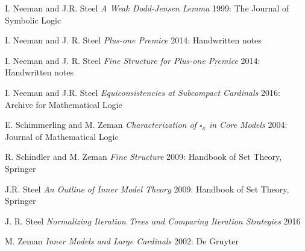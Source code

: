 \documentclass[12pt]{article}
\begin{document}
\begin{thebibliography}{1}


 I. Neeman and J.R. Steel {\em A Weak Dodd-Jensen Lemma} 1999: The Journal of Symbolic Logic

 I. Neeman and J. R. Steel {\em Plus-one Premice} 2014: Handwritten notes

 I. Neeman and J. R. Steel {\em Fine Structure for Plus-one Premice} 2014: Handwritten notes


 I. Neeman and J.R. Steel {\em Equiconsistencies at Subcompact Cardinals} 2016: Archive for Mathematical Logic


 E. Schimmerling and M. Zeman {\em Characterization of $\square_{\kappa}$ in Core Models} 2004: Journal of Mathematical Logic

 R. Schindler and M. Zeman {\em Fine Structure} 2009: Handbook of Set Theory, Springer



 J.R. Steel  {\em An Outline of Inner Model Theory} 2009: Handbook of Set Theory, Springer


 J. R. Steel {\em Normalizing Iteration Trees and Comparing Iteration Strategies} 2016

 M. Zeman {\em Inner Models and Large Cardinals} 2002: De Gruyter

\end{thebibliography}



\hfill \break
\\
\end{document}
